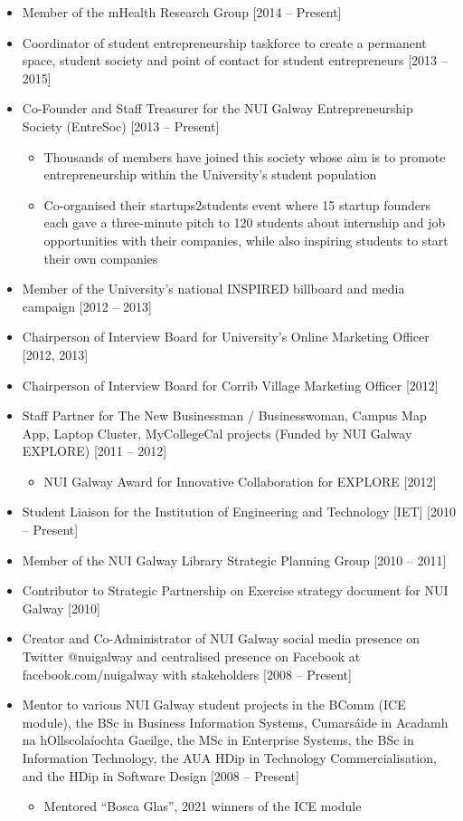 \documentclass[10pt,a4paper]{res} %
\begin{document}
\begin{resume}
\begin{itemize}
\item Member of the mHealth Research Group [2014 -- Present]
\item Coordinator of student entrepreneurship taskforce to create a permanent space, student society and point of contact for student entrepreneurs [2013 -- 2015]
\item Co-Founder and Staff Treasurer for the NUI Galway Entrepreneurship Society (EntreSoc) [2013 -- Present]
\begin{itemize} \itemsep -2pt
\item Thousands of members have joined this society whose aim is to promote entrepreneurship within the University's student population
\item Co-organised their startups2students event where 15 startup founders each gave a three-minute pitch to 120 students about internship and job opportunities with their companies, while also inspiring students to start their own companies
\end{itemize}
\item Member of the University's national INSPIRED billboard and media campaign [2012 -- 2013] 
\item Chairperson of Interview Board for University's Online Marketing Officer [2012, 2013]
\item Chairperson of Interview Board for Corrib Village Marketing Officer [2012]
\item Staff Partner for The New Businessman / Businesswoman, Campus Map App, Laptop Cluster, MyCollegeCal projects (Funded by NUI Galway EXPLORE) [2011 -- 2012]
\begin{itemize} \itemsep -2pt
\item NUI Galway Award for Innovative Collaboration for EXPLORE [2012]
\end{itemize}
\item Student Liaison for the Institution of Engineering and Technology [IET] [2010 -- Present]
\item Member of the NUI Galway Library Strategic Planning Group [2010 -- 2011]
\item Contributor to Strategic Partnership on Exercise strategy document for NUI Galway [2010]
\item Creator and Co-Administrator of NUI Galway social media presence on Twitter @nuigalway and centralised presence on Facebook at facebook.com/nuigalway with stakeholders [2008 -- Present]
\item Mentor to various NUI Galway student projects in the BComm (ICE module), the BSc in Business Information Systems, Cumars\'{a}ide in Acadamh na hOllscola\'{i}ochta Gaeilge, the MSc in Enterprise Systems, the BSc in Information Technology, the AUA HDip in Technology Commercialisation, and the HDip in Software Design [2008 -- Present]
\begin{itemize} \itemsep -2pt
\item Mentored ``Bosca Glas'', 2021 winners of the ICE module
\end{itemize}
\end{itemize}


\end{resume}
\end{document}

